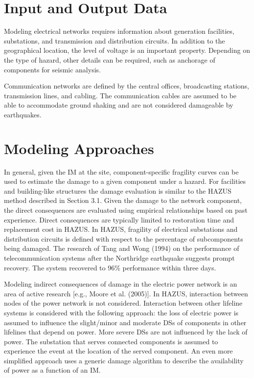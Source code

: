 \section{Input and Output Data}
\label{sec:perf_power_io}

Modeling electrical networks requires information about generation facilities, substations, and transmission and distribution circuits. In addition to the geographical location, the level of voltage is an important property. Depending on the type of hazard, other details can be required, such as anchorage of components for seismic analysis. 

Communication networks are defined by the central offices, broadcasting stations, transmission lines, and cabling. The communication cables are assumed to be able to accommodate ground shaking and are not considered damageable by earthquakes.

\section{Modeling Approaches}
\label{sec:perf_power_methods}

In general, given the IM at the site, component-specific fragility curves can be used to estimate the damage to a given component under a hazard. For facilities and building-like structures the damage evaluation is similar to the HAZUS method described in Section 3.1. Given the damage to the network component, the direct consequences are evaluated using empirical relationships based on past experience. Direct consequences are typically limited to restoration time and replacement cost in HAZUS. In HAZUS, fragility of electrical substations and distribution circuits is defined with respect to the percentage of subcomponents being damaged. The research of Tang and Wong (1994) on the performance of telecommunication systems after the Northridge earthquake suggests prompt recovery. The system recovered to 96\% performance within three days.

Modeling indirect consequences of damage in the electric power network is an area of active research [e.g., Moore et al. (2005)]. In HAZUS, interaction between nodes of the power network is not considered. Interaction between other lifeline systems is considered with the following approach: the loss of electric power is assumed to influence the slight/minor and moderate DSs of components in other lifelines that depend on power. More severe DSs are not influenced by the lack of power. The substation that serves connected components is assumed to experience the event at the location of the served component. An even more simplified approach uses a generic damage algorithm to describe the availability of power as a function of an IM. 

